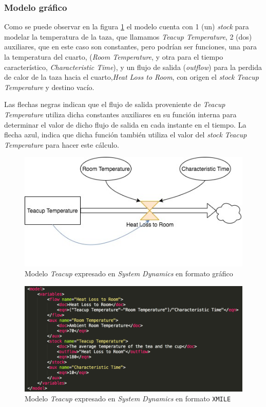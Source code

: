 \subsubsection{Modelo gráfico}
Como se puede observar en la figura \ref{fig:Teacup_sd} el modelo cuenta con 1 (un) \textit{stock} para modelar la temperatura de la taza, que llamamos \textit{Teacup Temperature}, 2 (dos) auxiliares, que en este caso son constantes, pero podrían ser funciones, una para la temperatura del cuarto, (\textit{Room Temperature}, y otra para el tiempo característico, \textit{Characteristic Time}), y un flujo de salida (\textit{outflow}) para la perdida de calor de la taza hacia el cuarto,\textit{Heat Loss to Room}, con origen el \textit{stock} \textit{Teacup Temperature} y destino vacío. 

Las flechas negras indican que el flujo de salida proveniente de \textit{Teacup Temperature} utiliza dicha constantes auxiliares en su función interna para determinar el valor de dicho flujo de salida en cada instante en el tiempo. La flecha azul, indica que dicha función también utiliza el valor del \textit{stock} \textit{Teacup Temperature} para hacer este cálculo. 

\begin{figure}[!h]
\centering
\includegraphics[scale=0.5]{imagenes/Teacup_sd.jpg}
\caption{Modelo \textit{Teacup} expresado en \textit{System Dynamics} en formato gráfico}
\label{fig:Teacup_sd}
\end{figure}

\begin{figure}[!h]
\centering
\includegraphics[scale=0.5]{imagenes/teacup_mapeo/Teacup_variables}
\caption{Modelo \textit{Teacup} expresado en \textit{System Dynamics} en formato \texttt{XMILE}}
\label{fig:Teacup_xmile}
\end{figure}

